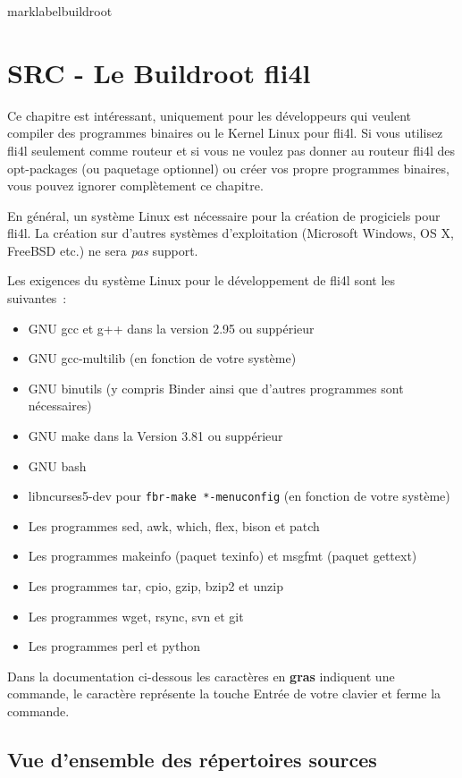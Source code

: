 marklabel{buildroot}{
\section{SRC - Le Buildroot fli4l}
}

Ce chapitre est intéressant, uniquement pour les développeurs qui veulent
compiler des programmes binaires ou le Kernel Linux pour fli4l. Si vous
utilisez fli4l seulement comme routeur et si vous ne voulez pas donner au
routeur fli4l des opt-packages (ou paquetage optionnel) ou créer vos propre
programmes binaires, vous pouvez ignorer complètement ce chapitre.

En général, un système Linux est nécessaire pour la création de progiciels pour
fli4l. La création sur d'autres systèmes d'exploitation (Microsoft Windows,
OS X, FreeBSD etc.) ne sera \emph{pas} support.

Les exigences du système Linux pour le développement de fli4l sont les suivantes~:
\begin{itemize}
\item GNU gcc et g++ dans la version 2.95 ou suppérieur
\item GNU gcc-multilib (en fonction de votre système)
\item GNU binutils (y compris Binder ainsi que d'autres programmes sont nécessaires)
\item GNU make dans la Version 3.81 ou suppérieur
\item GNU bash
\item libncurses5-dev pour \texttt{fbr-make *-menuconfig} (en fonction de votre système)
\item Les programmes sed, awk, which, flex, bison et patch
\item Les programmes makeinfo (paquet texinfo) et msgfmt (paquet gettext)
\item Les programmes tar, cpio, gzip, bzip2 et unzip
\item Les programmes wget, rsync, svn et git
\item Les programmes perl et python
\end{itemize}

Dans la documentation ci-dessous les caractères en \textbf{gras} indiquent
une commande, le caractère \enter représente la touche Entrée de votre
clavier et ferme la commande.

\subsection{Vue d'ensemble des répertoires sources}

